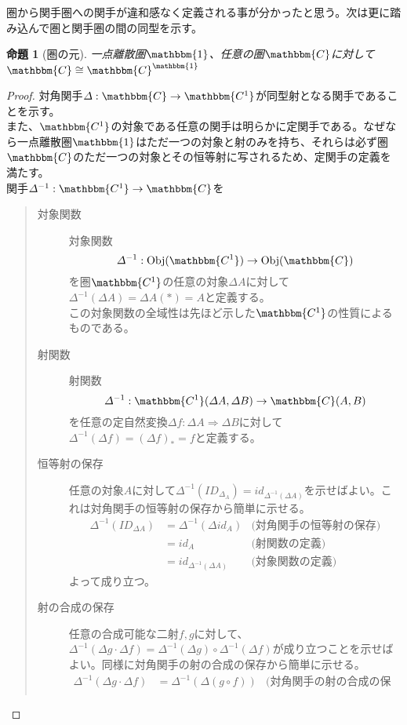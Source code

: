 \documentclass[uplatex,dvipdfmx]{jsarticle}
\newcommand{\cat}[1]{\mathbbm{#1}}
\newcommand{\arrow}{\rightarrow}
\newcommand{\functor}[3]{#1:\cat{#2}\arrow \cat{#3}}
\newcommand{\nat}[3]{#1:#2\Rightarrow #3}
\newcommand{\obj}[1]{\mathrm{Obj}(\cat{#1})}
\newcommand{\mor}[3]{#1:#2\arrow #3}
\newcommand{\arset}[3]{\cat{#1}(#2,#3)}
\newcommand{\funccat}[2]{\cat{#2}^\cat{#1}}
\newtheorem{proof}{証明}[section]
\newtheorem{prop}{命題}[section]
\numberwithin{proof}{subsection}
\numberwithin{prop}{subsection}
\numberwithin{define}{subsection}
\begin{document}
  圏から関手圏への関手が違和感なく定義される事が分かったと思う。次は更に踏み込んで圏と関手圏の間の同型を示す。
  \begin{prop}[圏の元]
    一点離散圏$\cat{1}$、任意の圏$\cat{C}$に対して$\cat{C}\cong\funccat{1}{C}$
  \end{prop}
  \begin{proof}
    対角関手$\functor{\varDelta}{C}{C^1}$が同型射となる関手であることを示す。\\
    また、$\cat{C^1}$の対象である任意の関手は明らかに定関手である。なぜなら一点離散圏$\cat{1}$はただ一つの対象と射のみを持ち、それらは必ず圏$\cat{C}$のただ一つの対象とその恒等射に写されるため、定関手の定義を満たす。\\
    関手$\functor{\varDelta^{-1}}{C^1}{C}$を
    \begin{quote}
			\begin{description}
				\item[対象関数]対象関数\[\mor{\varDelta^{-1}}{\obj{C^1}}{\obj{C}}\]を圏$\cat{C^1}$の任意の対象$\varDelta A$に対して$\varDelta^{-1}(\varDelta A)=\varDelta A(*)=A$と定義する。\\
        この対象関数の全域性は先ほど示した$\cat{C^1}$の性質によるものである。
				\item[射関数]射関数\[\mor{\varDelta^{-1}}{\arset{C^1}{\varDelta A}{\varDelta B}}{\arset{C}{A}{B}}\]を任意の定自然変換$\nat{\varDelta f}{\varDelta A}{\varDelta B}$に対して$\varDelta^{-1}(\varDelta f) = (\varDelta f)_*=f$と定義する。
				\item[恒等射の保存]任意の対象$A$に対して$\varDelta^{-1}(ID_{\varDelta_A})=id_{\varDelta^{-1}(\varDelta A)}$を示せばよい。これは対角関手の恒等射の保存から簡単に示せる。
				\begin{align*}
          \varDelta^{-1}(ID_{\varDelta A})&=\varDelta^{-1}(\varDelta id_A)&\text{(対角関手の恒等射の保存)}\\
          &=id_A&\text{(射関数の定義)}\\
          &=id_{\varDelta^{-1}(\varDelta A)}&\text{(対象関数の定義)}
        \end{align*}
        よって成り立つ。
				\item[射の合成の保存]任意の合成可能な二射$f,g$に対して、$\varDelta^{-1}(\varDelta g\cdot\varDelta f)=\varDelta^{-1}(\varDelta g)\circ\varDelta^{-1}(\varDelta f)$が成り立つことを示せばよい。同様に対角関手の射の合成の保存から簡単に示せる。
				\begin{align*}
          \varDelta^{-1}(\varDelta g\cdot\varDelta f)&=\varDelta^{-1}(\varDelta(g\circ f))&\text{(対角関手の射の合成の保存)}\\

\end{align*}
\end{description}
\end{quote}
\end{proof}
\end{document}
